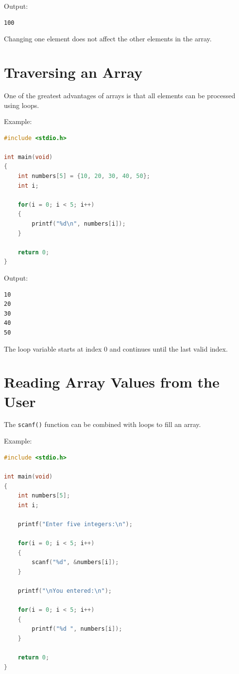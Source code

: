 \documentclass[12pt,openany]{book}
\begin{document}
Output:

\begin{lstlisting}
100
\end{lstlisting}

Changing one element does not affect the other elements in the array.

\section{Traversing an Array}

One of the greatest advantages of arrays is that all elements can be processed using loops.

Example:

\begin{lstlisting}[language=C]
#include <stdio.h>

int main(void)
{
    int numbers[5] = {10, 20, 30, 40, 50};
    int i;

    for(i = 0; i < 5; i++)
    {
        printf("%d\n", numbers[i]);
    }

    return 0;
}
\end{lstlisting}

Output:

\begin{lstlisting}
10
20
30
40
50
\end{lstlisting}

The loop variable starts at index 0 and continues until the last valid index.

\section{Reading Array Values from the User}

The \texttt{scanf()} function can be combined with loops to fill an array.

Example:

\begin{lstlisting}[language=C]
#include <stdio.h>

int main(void)
{
    int numbers[5];
    int i;

    printf("Enter five integers:\n");

    for(i = 0; i < 5; i++)
    {
        scanf("%d", &numbers[i]);
    }

    printf("\nYou entered:\n");

    for(i = 0; i < 5; i++)
    {
        printf("%d ", numbers[i]);
    }

    return 0;
}
\end{lstlisting}
\end{document}
